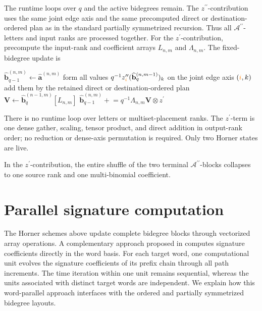\documentclass{amsart}
\theoremstyle{definition}
\theoremstyle{remark}
\newcommand{\orange}[1]{{\color{orange}#1}}
\begin{document}
\begin{implrmk}
The runtime loops over $q$ and the active bidegrees remain. The
$z^{\prime\prime}$-contribution uses the same joint edge axis and the same
precomputed direct or destination-ordered plan as in the standard partially
symmetrized recursion. Thus all $\mathcal{A}^{\prime\prime}$-letters and
input ranks are processed together. For the $z^{\prime}$-contribution,
precompute the input-rank and coefficient arrays $L_{n,m}$ and
$\Lambda_{n,m}$. The fixed-bidegree update is
\begin{algorithmic}[1]
\State $\widehat{\mathbf{b}}_{q-1}^{(n,m)}
    \gets\widehat{\mathbf{a}}^{(n,m)}$
    \State form all values
    $q^{-1}z^{\prime\prime}_{\orange{i}}
    (\widehat{\mathbf{b}}_q^{(n,m-1)})_k$
    on the joint edge axis $(\orange{i},k)$
    \State add them by the retained direct or destination-ordered plan
\EndIf
{}
    \State $\mathbf{V}\gets
        \widehat{\mathbf{b}}_{q}^{(n-1,m)}[L_{n,m}]$
    \State $\widehat{\mathbf{b}}_{q-1}^{(n,m)}
        \mathrel{+}=
        q^{-1}\Lambda_{n,m}\mathbf{V}\otimes z^{\prime}$
\EndIf
\end{algorithmic}
There is no runtime loop over letters or multiset-placement ranks. The
$z^{\prime}$-term is one dense gather, scaling, tensor product, and direct
addition in output-rank order; no reduction or dense-axis permutation is
required. Only two Horner states are live.
\end{implrmk}

In the $z^{\prime}$-contribution, the entire shuffle of the two terminal
$\mathcal{A}^{\prime\prime}$-blocks collapses to one source rank and one
multi-binomial coefficient.

\section{Parallel signature computation}
\label{sec:parallel_signature_computation}

The Horner schemes above update complete bidegree blocks through vectorized
array operations. A complementary approach proposed in
\cite{nygaard2026pathsig} computes signature
coefficients directly in the word basis. For each target word, one
computational unit evolves the signature coefficients of its prefix chain
through all path increments. The time iteration within one unit remains
sequential, whereas the units associated with distinct target words are
independent. We explain how this word-parallel approach interfaces with the
ordered and partially symmetrized bidegree layouts.
\end{document}
